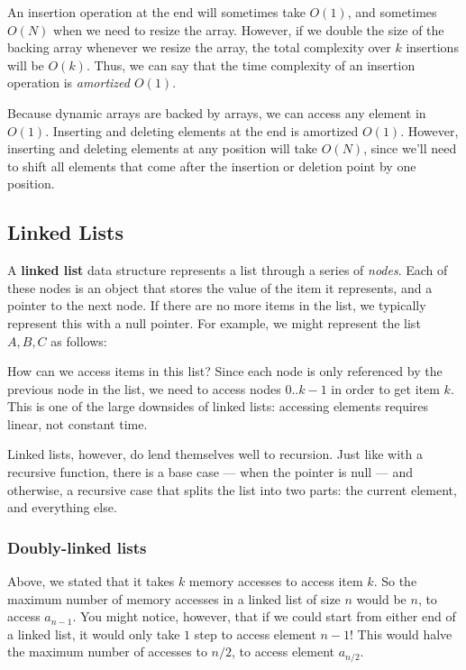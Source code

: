 An insertion operation at the end will sometimes take $O(1)$, and sometimes $O(N)$ when we need to resize the array. However, if we double the size of the backing array whenever we resize the array, the total complexity over $k$ insertions will be $O(k)$. Thus, we can say that the time complexity of an insertion operation is \textit{amortized $O(1)$}.

Because dynamic arrays are backed by arrays, we can access any element in $O(1)$. Inserting and deleting elements at the end is amortized $O(1)$. However, inserting and deleting elements at any position will take $O(N)$, since we'll need to shift all elements that come after the insertion or deletion point by one position.


\subsection{Linked Lists}

A \textbf{linked list} data structure represents a list through a series of \textit{nodes}. Each of these nodes is an object that stores the value of the item it represents, and a pointer to the next node. If there are no more items in the list, we typically represent this with a null pointer. For example, we might represent the list $A, B, C$ as follows:


How can we access items in this list? Since each node is only referenced by the previous node in the list, we need to access nodes $0..k-1$ in order to get item $k$. This is one of the large downsides of linked lists: accessing elements requires linear, not constant time.

Linked lists, however, do lend themselves well to recursion. Just like with a recursive function, there is a base case --- when the pointer is null --- and otherwise, a recursive case that splits the list into two parts: the current element, and everything else.

\subsubsection{Doubly-linked lists}
Above, we stated that it takes $k$ memory accesses to access item $k$. So the maximum number of memory accesses in a linked list of size $n$ would be $n$, to access $a_{n-1}$. You might notice, however, that if we could start from either end of a linked list, it would only take $1$ step to access element $n-1$! This would halve the maximum number of accesses to $n/2$, to access element $a_{n/2}$.

